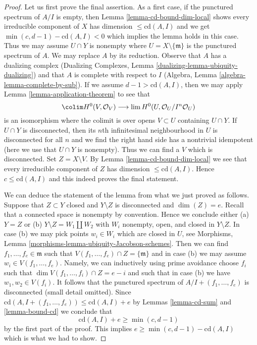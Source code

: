 \begin{proof}
Let us first prove the final assertion. As a first case, if the punctured
spectrum of $A/I$ is empty, then Lemma \ref{lemma-cd-bound-dim-local}
shows every irreducible component of $X$ has dimension
$\leq \text{cd}(A, I)$ and we get $\min(c, d - 1) - \text{cd}(A, I) < 0$
which implies the lemma holds in this case. Thus we may assume
$U \cap Y$ is nonempty where $U = X \setminus \{\mathfrak m\}$
is the punctured spectrum of $A$. We may replace $A$ by its reduction.
Observe that $A$ has a dualizing complex
(Dualizing Complexes, Lemma \ref{dualizing-lemma-ubiquity-dualizing})
and that $A$ is complete with respect to $I$
(Algebra, Lemma \ref{algebra-lemma-complete-by-sub}).
If we assume $d - 1 > \text{cd}(A, I)$, then we may apply
Lemma \ref{lemma-application-theorem} to see that
$$
\colim H^0(V, \mathcal{O}_V)
\longrightarrow
\lim H^0(U, \mathcal{O}_U/I^n\mathcal{O}_U)
$$
is an isomorphism where the colimit is over opens $V \subset U$
containing $U \cap Y$. If $U \cap Y$ is disconnected, then
its $n$th infinitesimal neighbourhood in $U$ is disconnected
for all $n$ and we find the
right hand side has a nontrivial idempotent (here we use
that $U \cap Y$ is nonempty).
Thus we can find a $V$ which is disconnected.
Set $Z = X \setminus V$. By Lemma \ref{lemma-cd-bound-dim-local}
we see that every irreducible component of $Z$ has dimension
$\leq \text{cd}(A, I)$. Hence $c \leq \text{cd}(A, I)$ and this
indeed proves the final statement.

\medskip\noindent
We can deduce the statement of the lemma from what we just proved
as follows. Suppose that $Z \subset Y$ closed and $Y \setminus Z$ is
disconnected and $\dim(Z) = e$. Recall that a connected space is nonempty
by convention. Hence we conclude either (a) $Y = Z$ or (b)
$Y \setminus Z = W_1 \amalg W_2$ with $W_i$ nonempty, open, and closed
in $Y \setminus Z$. In case (b) we may pick points $w_i \in W_i$
which are closed in $U$, see
Morphisms, Lemma \ref{morphisms-lemma-ubiquity-Jacobson-schemes}.
Then we can find $f_1, \ldots, f_e \in \mathfrak m$
such that $V(f_1, \ldots, f_e) \cap Z = \{\mathfrak m\}$
and in case (b) we may assume $w_i \in V(f_1, \ldots, f_e)$.
Namely, we can inductively using prime avoidance
choose $f_i$ such that $\dim V(f_1, \ldots, f_i) \cap Z = e - i$
and such that in case (b) we have $w_1, w_2 \in V(f_i)$.
It follows that the punctured spectrum of $A/I + (f_1, \ldots, f_e)$
is disconnected (small detail omitted). Since
$\text{cd}(A, I + (f_1, \ldots, f_e)) \leq \text{cd}(A, I) + e$
by Lemmas \ref{lemma-cd-sum} and \ref{lemma-bound-cd} we conclude that
$$
\text{cd}(A, I) + e \geq \min(c, d - 1)
$$
by the first part of the proof. This implies
$e \geq \min(c, d - 1) - \text{cd}(A, I)$ which is what we had to show.
\end{proof}

